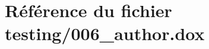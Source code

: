 \hypertarget{006__author_8dox}{}\section{Référence du fichier testing/006\+\_\+author.dox}
\label{006__author_8dox}
